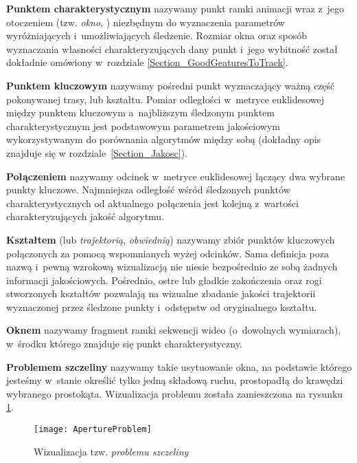     \textbf{Punktem charakterystycznym} nazywamy punkt ramki animacji wraz z~jego otoczeniem (tzw. \textit{okno}, \cite{SalientPointsTracking05}) niezbędnym do wyznaczenia parametrów wyróżniających i~umożliwiających śledzenie. Rozmiar okna oraz sposób wyznaczania własności charakteryzujących dany punkt i~jego wybitność został dokładnie omówiony w~rozdziale \ref{Section_GoodGeaturesToTrack}.

    \textbf{Punktem kluczowym} nazywamy pośredni punkt wyznaczający ważną część pokonywanej trasy, lub kształtu. Pomiar odległości w~metryce euklidesowej między punktem kluczowym a~najbliższym śledzonym punktem charakterystycznym jest podstawowym parametrem jakościowym wykorzystywanym do porównania algorytmów między sobą (dokładny opis znajduje się w rozdziale~\ref{Section_Jakosc}).

    \textbf{Połączeniem} nazywamy odcinek w~metryce euklidesowej łączący dwa wybrane punkty kluczowe. Najmniejsza odległość wśród śledzonych punktów charakterystycznych od aktualnego połączenia jest kolejną z~wartości charakteryzujących jakość algorytmu.

    \textbf{Kształtem} (lub \textit{trajektorią}, \textit{obwiednią}) nazywamy zbiór punktów kluczowych połączonych za pomocą wspomnianych wyżej odcinków. Sama definicja poza nazwą i~pewną wzrokową wizualizacją nie niesie bezpośrednio ze sobą żadnych informacji jakościowych. Pośrednio, ostre lub gładkie zakończenia oraz rogi stworzonych kształtów pozwalają na wizualne zbadanie jakości trajektorii wyznaczonej przez śledzone punkty i~odstępstw od oryginalnego kształtu.

    \textbf{Oknem} nazywamy fragment ramki sekwencji wideo (o~dowolnych wymiarach), w~środku którego znajduje się punkt charakterystyczny.

    \textbf{Problemem szczeliny} nazywamy takie usytuowanie okna, na podstawie którego jesteśmy w~stanie określić tylko jedną składową ruchu, prostopadłą do krawędzi wybranego prostokąta. Wizualizacja problemu została zamieszczona na rysunku \ref{fig:ApertureProblem}.

    \begin{figure}[!ht]
      \centering
      \texttt{[image: ApertureProblem]}
      \caption[Wizualizacja tzw. problemu szczeliny]{Wizualizacja tzw. \textit{problemu szczeliny}}
      \label{fig:ApertureProblem}
    \end{figure}

  \newpage
